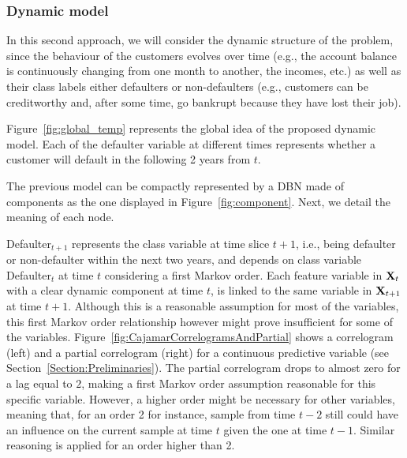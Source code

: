 \subsubsection*{Dynamic model} 

In this second approach, we will consider the dynamic structure of the problem, since the behaviour of the customers evolves over time (e.g., the account balance is continuously changing from one month to another, the incomes, etc.) as well as their class labels either defaulters or non-defaulters (e.g., customers can be creditworthy and, after some time, go bankrupt because they have lost their job). 

Figure~\ref{fig:global_temp} represents the global idea of the proposed dynamic model. Each of the defaulter variable at different times represents whether a customer will default in the following 2 years from $t$. 

The previous model can be compactly represented by a DBN made of components as the one displayed in 
Figure~\ref{fig:component}. Next, we detail the meaning of each node.

Defaulter$_{t+1}$ represents the class variable at time slice $t+1$, i.e., being defaulter or non-defaulter within the next two years, and depends on class variable Defaulter$_{t}$ at time $t$ considering a first Markov order. Each feature variable in ${\bf X}_t$ with a clear dynamic component at time $t$, is linked to the same variable in ${\bf X}_{t+1}$ at time $t+1$. Although this is a reasonable assumption for most of the variables, this first Markov order relationship however might prove insufficient for some of the variables. Figure~\ref{fig:CajamarCorrelogramsAndPartial} shows a correlogram (left) and a partial  correlogram (right) for a continuous predictive variable (see Section~\ref{Section:Preliminaries}). The partial correlogram drops to almost zero for a lag equal to $2$, making a first Markov order assumption reasonable for this specific variable. However, a higher order might be necessary for other variables, meaning that, for an order 2 for instance, sample from time $t-2$ still could have an influence on the current sample at time $t$ given the one at time $t-1$. Similar reasoning is applied for an order higher than 2.  

